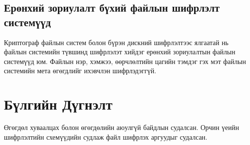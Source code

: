 \subsection*{Ерөнхий зориулалт бүхий файлын шифрлэлт системүүд}

Криптограф файлын систем болон бүрэн дискний шифрлэлтээс ялгаатай нь файлын системийн түвшинд шифрлэлэт хийдэг ерөнхий зориулалтын файлын системүүд юм. Файлын нэр, хэмжээ, өөрчлөлтийн цагийн тэмдэг гэх мэт файлын системийн мета өгөгдлийг ихэвчлэн шифрлэдэггүй.


\section{Бүлгийн Дүгнэлт}

Өгөгдөл хуваалцах болон өгөгдөлийн аюулгүй байдлын судалсан. Орчин үеийн шифрлэлтийн схемүүдийн судлаж файл шифрлэх аргуудыг судалсан.
